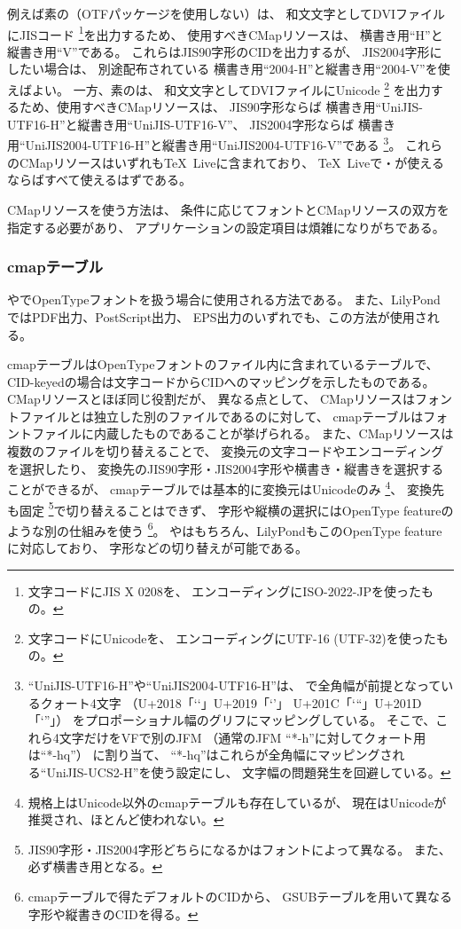 例えば素の（OTFパッケージを使用しない）\pTeX は、
和文文字としてDVIファイルにJISコード
\footnote{文字コードにJIS X 0208を、
  エンコーディングにISO-2022-JPを使ったもの。}を出力するため、
使用すべきCMapリソースは、
横書き用``H''と縦書き用``V''である。
これらはJIS90字形のCIDを出力するが、
JIS2004字形にしたい場合は、
別途配布\cite{jfontmaps}されている
横書き用``2004-H''と縦書き用``2004-V''を使えばよい。
一方、素の\upTeX は、
和文文字としてDVIファイルにUnicode \footnote{文字コードにUnicodeを、
  エンコーディングにUTF-16 (UTF-32)を使ったもの。}
を出力するため、使用すべきCMapリソースは、
JIS90字形ならば
横書き用``UniJIS-UTF16-H''と縦書き用``UniJIS-UTF16-V''、
JIS2004字形ならば
横書き用``UniJIS2004-UTF16-H''と縦書き用``UniJIS2004-UTF16-V''である
\footnote{``UniJIS-UTF16-H''や``UniJIS2004-UTF16-H''は、
  \upTeX で全角幅が前提となっているクォート4文字
  （U+2018「\ltjjachar`‘」U+2019「\ltjjachar`’」
    U+201C「\ltjjachar`“」U+201D「\ltjjachar`”」）
  をプロポーショナル幅のグリフにマッピングしている。
  そこで、これら4文字だけをVFで別のJFM
  （通常のJFM ``*-h''に対してクォート用は``*-hq''） に割り当て、
  ``*-hq''はこれらが全角幅にマッピングされる``UniJIS-UCS2-H''を使う設定にし、
  文字幅の問題発生を回避している。}。
これらのCMapリソースはいずれも\TeX \ Liveに含まれており、
\TeX \ Liveで\pTeX ・\upTeX が使えるならばすべて使えるはずである。

CMapリソースを使う方法は、
条件に応じてフォントとCMapリソースの双方を指定する必要があり、
アプリケーションの設定項目は煩雑になりがちである。

\subsubsection{cmapテーブル}

\LuaTeX や\XeTeX でOpenTypeフォントを扱う場合に使用される方法である。
また、LilyPond \cite{lilypond}ではPDF出力、PostScript出力、
EPS出力のいずれでも、この方法が使用される。

cmapテーブルはOpenTypeフォントのファイル内に含まれているテーブルで、
CID-keyedの場合は文字コードからCIDへのマッピングを示したものである。
CMapリソースとほぼ同じ役割だが、
異なる点として、
CMapリソースはフォントファイルとは独立した別のファイルであるのに対して、
cmapテーブルはフォントファイルに内蔵したものであることが挙げられる。
また、CMapリソースは複数のファイルを切り替えることで、
変換元の文字コードやエンコーディングを選択したり、
変換先のJIS90字形・JIS2004字形や横書き・縦書きを選択することができるが、
cmapテーブルでは基本的に変換元はUnicodeのみ
\footnote{規格上はUnicode以外のcmapテーブルも存在しているが、
  現在はUnicodeが推奨され、ほとんど使われない。}、
変換先も固定
\footnote{JIS90字形・JIS2004字形どちらになるかはフォントによって異なる。
  また、必ず横書き用となる。}で切り替えることはできず、
字形や縦横の選択にはOpenType featureのような別の仕組みを使う
\footnote{cmapテーブルで得たデフォルトのCIDから、
  GSUBテーブルを用いて異なる字形や縦書きのCIDを得る。}。
\LuaTeX や\XeTeX はもちろん、LilyPondもこのOpenType featureに対応しており、
字形などの切り替えが可能である。


